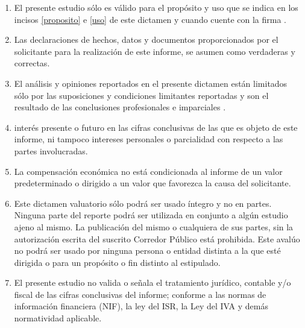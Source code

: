 \begin{enumerate}
	\item El presente estudio s\'olo es v\'alido para el prop\'osito y uso que se indica en los incisos \ref{proposito} e \ref{uso} de este dictamen y cuando cuente con la firma .
	\item Las declaraciones de hechos, datos y documentos proporcionados por el solicitante para la realizaci\'on de este informe, se asumen como verdaderas y correctas.
	\item El an\'alisis y opiniones reportados en el presente dictamen est\'an limitados s\'olo por las suposiciones y condiciones limitantes reportadas y son el resultado de las conclusiones profesionales e imparciales  .
	\item  {} inter\'es presente o futuro en las cifras conclusivas de las que es objeto de este informe, ni tampoco   intereses personales o parcialidad con respecto a las partes involucradas.
	\item La compensaci\'on econ\'omica   no est\'a condicionada al informe de un valor predeterminado o dirigido a un valor que favorezca la causa del solicitante.
	\item Este dictamen valuatorio s\'olo podr\'a ser usado \'integro y no en partes. Ninguna parte del reporte podr\'a ser utilizada en conjunto a alg\'un estudio ajeno al mismo. La publicaci\'on del mismo o cualquiera de sus partes, sin la autorizaci\'on escrita del suscrito Corredor P\'ublico est\'a prohibida. Este aval\'uo no podr\'a ser usado por ninguna persona o entidad distinta a la que est\'e dirigida o para un prop\'osito o fin distinto al estipulado.
	\item El presente estudio no valida o se\~nala el tratamiento jur\'idico, contable y/o fiscal de las cifras conclusivas del informe; conforme a las normas de informaci\'on financiera (NIF), la ley del ISR, la Ley del IVA y dem\'as normatividad aplicable.

\end{enumerate}